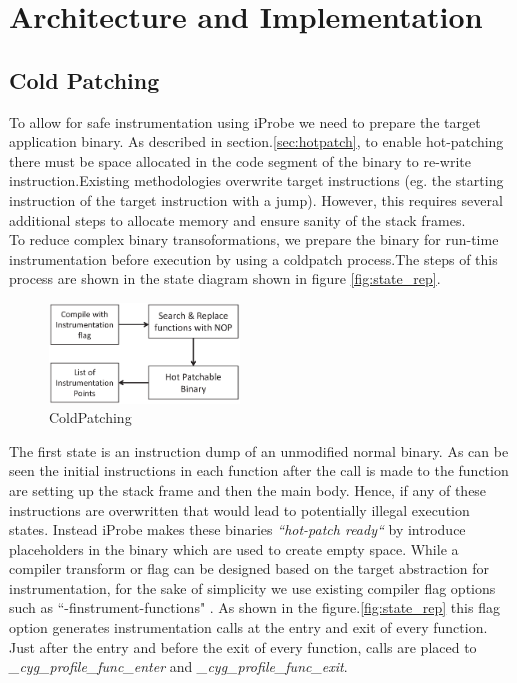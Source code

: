 \section{Architecture and Implementation}

\subsection{Cold Patching}
\label{sec:coldpatch}


To allow for safe instrumentation using iProbe we need to prepare the target application binary. As described in section.\ref{sec:hotpatch}, to enable hot-patching there must be space allocated in the code segment of the binary to re-write instruction.Existing methodologies overwrite target instructions (eg. the starting instruction of the target instruction with a 
jump). However, this requires several additional steps to allocate memory and ensure sanity of the stack frames. 
\\
\indent To reduce complex binary transoformations, we prepare the binary for run-time instrumentation before execution by using a coldpatch process.The steps of this process are shown in the state diagram shown in figure \ref{fig:state_rep}. 

\begin{figure}[hbt]
  \begin{center}
    \includegraphics[width=0.45\textwidth]{Images/coldpatch.eps}
    \caption{ColdPatching }
    \label{fig:coldpatch}
  \end{center}
\end{figure}

The first state is an instruction dump of an unmodified normal binary. As can be seen the initial instructions in each function after the call is made to the function are setting up the stack frame and then the main body. Hence, if any of these instructions are overwritten that would lead to potentially illegal execution states. Instead iProbe makes these binaries \textit{``hot-patch ready``} by introduce placeholders in the binary which are used to create empty space. While a compiler transform or flag can be designed based on the target abstraction for instrumentation, for the sake of simplicity we use existing compiler flag options such as ``-finstrument-functions" \cite{gcc_codegen}. As shown in the figure.\ref{fig:state_rep} this flag option generates instrumentation calls at the entry and exit of every function. Just after the entry and before the exit of every function, calls are placed to \emph{\_cyg\_profile\_func\_enter} and \emph{\_cyg\_profile\_func\_exit}. 

